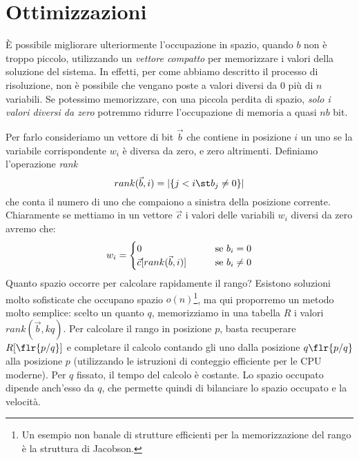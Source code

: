 \section{Ottimizzazioni}
È possibile migliorare ulteriormente l'occupazione in spazio, quando $b$ non è troppo piccolo, utilizzando un \textit{vettore compatto} per memorizzare i valori della soluzione del sistema. In effetti, per come abbiamo descritto il processo di risoluzione, non è possibile che vengano poste a valori diversi da 0 più di $n$ variabili. Se potessimo memorizzare, con una piccola perdita di spazio, \textit{solo i valori diversi da zero} potremmo ridurre l'occupazione di memoria a quasi $nb$ bit.

Per farlo consideriamo un vettore di bit $\vec{b}$ che contiene in posizione $i$ un uno se la variabile corrispondente $w_i$ è diversa da zero, e zero altrimenti. Definiamo l'operazione \textit{rank}
\begin{equation*}
    rank(\vec{b}, i) = |\{j < i \st b_j \neq 0\}|
\end{equation*}
che conta il numero di uno che compaiono a sinistra della posizione corrente. Chiaramente se mettiamo in un vettore $\vec{c}$ i valori delle variabili $w_i$ diversi da zero avremo che:
\begin{equation*}
    w_i =
    \begin{cases}
        0 \hspace{7mm} &\textnormal{se } b_i = 0\\
        \vec{c}[rank(\vec{b}, i)] \hspace{7mm} &\textnormal{se } b_i \neq 0\\
    \end{cases}
\end{equation*}
Quanto spazio occorre per calcolare rapidamente il rango? Esistono soluzioni molto sofisticate che occupano spazio $o(n)$\footnote{Un esempio non banale di strutture efficienti per la memorizzazione del rango è la struttura di Jacobson.}, ma qui proporremo un metodo molto semplice: scelto un quanto $q$, memorizziamo in una tabella $R$ i valori $rank(\vec{b}, kq)$. Per calcolare il rango in posizione $p$, basta recuperare $R[\flr{p / q}]$ e completare il calcolo contando gli uno dalla posizione $q\flr{p / q}$ alla posizione $p$ (utilizzando le istruzioni di conteggio efficiente per le CPU moderne). Per $q$ fissato, il tempo del calcolo è costante. Lo spazio occupato dipende anch'esso da $q$, che permette quindi di bilanciare lo spazio occupato e la velocità.

